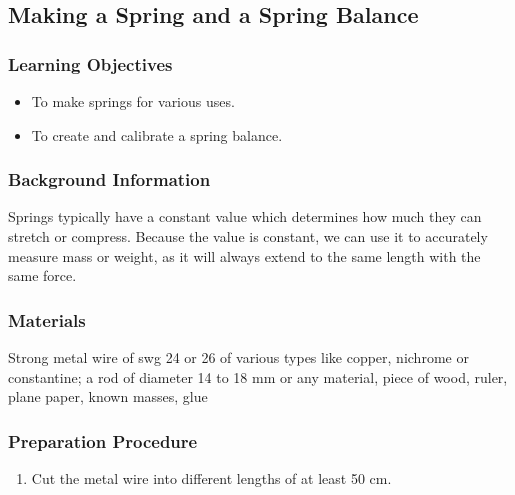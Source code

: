 \subsection{Making a Spring and a Spring Balance}

\subsubsection*{Learning Objectives}
\begin{itemize}
\item{To make springs for various uses.}
\item{To create and calibrate a spring balance.}
\end{itemize}

\subsubsection*{Background Information}
Springs typically have a constant value which determines how much they can stretch or compress.  Because the value is constant, we can use it to accurately measure mass or weight, as it will always extend to the same length with the same force.

\subsubsection*{Materials}
Strong metal wire of swg 24 or 26 of various types like copper, nichrome or constantine; a rod of diameter 14 to 18 mm or any material, piece of wood, ruler, plane paper, known masses, glue

\subsubsection*{Preparation Procedure}
\begin{enumerate}
\item{Cut the metal wire into different lengths of at least 50 cm.}
\end{enumerate}

